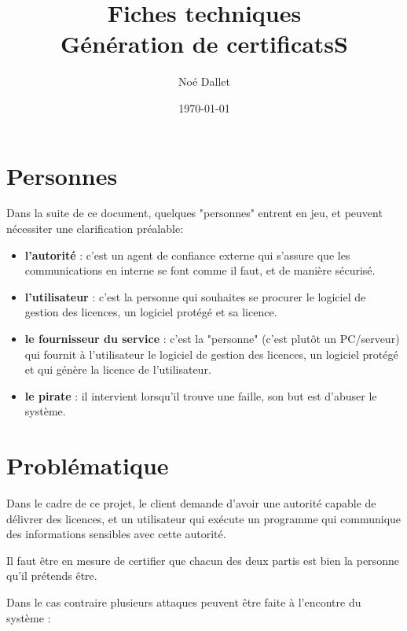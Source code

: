 \documentclass{article}
\title{
    \Huge
    Fiches techniques\\
    Génération de certificatsS
}
\author{\huge Noé Dallet}
\date{\huge \today}
\begin{document}
\maketitle
\newpage

\section{Personnes}

Dans la suite de ce document, quelques "personnes" entrent en jeu, et peuvent nécessiter une clarification préalable:

\begin{itemize}
    \item \textbf{l'autorité} : c'est un agent de confiance externe qui s'assure que les communications en interne se font comme il faut, et de manière sécurisé.
    \item \textbf{l'utilisateur} : c'est la personne qui souhaites se procurer le logiciel de gestion des licences, un logiciel protégé et sa licence. 
    \item \textbf{le fournisseur du service} : c'est la "personne" (c'est plutôt un PC/serveur) qui fournit à l'utilisateur le logiciel de gestion des licences, un logiciel protégé et qui génère la licence de l'utilisateur.
    \item \textbf{le pirate} : il intervient lorsqu'il trouve une faille, son but est d'abuser le système.
\end{itemize}


\section{Problématique}

Dans le cadre de ce projet, le client demande d'avoir une autorité capable de délivrer des licences, et un utilisateur qui exécute un programme qui communique des informations sensibles avec cette autorité.

Il faut être en mesure de certifier que chacun des deux partis est bien la personne qu'il prétends être.

Dans le cas contraire plusieurs attaques peuvent être faite à l'encontre du système :
\end{document}
